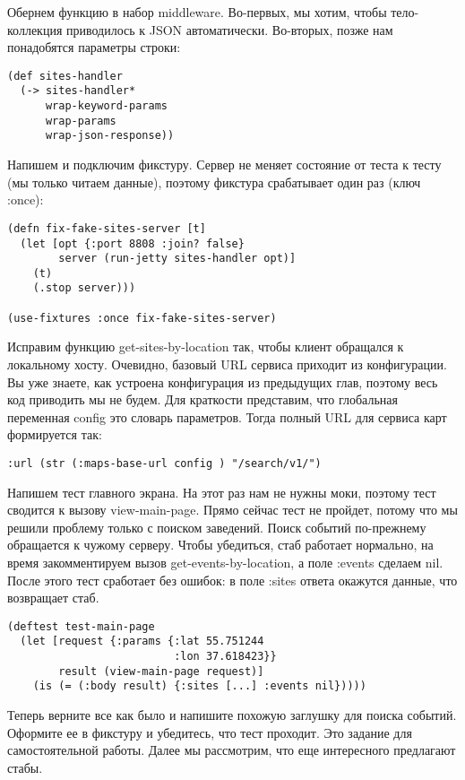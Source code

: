 Обернем функцию в набор middleware. Во-первых, мы хотим, чтобы тело-коллекция
приводилось к JSON автоматически. Во-вторых, позже нам понадобятся параметры
строки:

\begin{verbatim}
(def sites-handler
  (-> sites-handler*
      wrap-keyword-params
      wrap-params
      wrap-json-response))
\end{verbatim}

Напишем и подключим фикстуру. Сервер не меняет состояние от теста к тесту (мы
только читаем данные), поэтому фикстура срабатывает один раз (ключ :once):

\begin{verbatim}
(defn fix-fake-sites-server [t]
  (let [opt {:port 8808 :join? false}
        server (run-jetty sites-handler opt)]
    (t)
    (.stop server)))

(use-fixtures :once fix-fake-sites-server)
\end{verbatim}

Исправим функцию get-sites-by-location так, чтобы клиент обращался к локальному
хосту. Очевидно, базовый URL сервиса приходит из конфигурации. Вы уже знаете,
как устроена конфигурация из предыдущих глав, поэтому весь код приводить мы не
будем. Для краткости представим, что глобальная переменная config это словарь
параметров. Тогда полный URL для сервиса карт формируется так:

\begin{verbatim}
:url (str (:maps-base-url config ) "/search/v1/")
\end{verbatim}

Напишем тест главного экрана. На этот раз нам не нужны моки, поэтому тест
сводится к вызову view-main-page. Прямо сейчас тест не пройдет, потому что мы
решили проблему только с поиском заведений. Поиск событий по-прежнему обращается
к чужому серверу. Чтобы убедиться, стаб работает нормально, на время
закомментируем вызов get-events-by-location, а поле :events сделаем nil. После
этого тест сработает без ошибок: в поле :sites ответа окажутся данные, что
возвращает стаб.

\begin{verbatim}
(deftest test-main-page
  (let [request {:params {:lat 55.751244
                          :lon 37.618423}}
        result (view-main-page request)]
    (is (= (:body result) {:sites [...] :events nil}))))
\end{verbatim}

Теперь верните все как было и напишите похожую заглушку для поиска
событий. Оформите ее в фикстуру и убедитесь, что тест проходит. Это задание для
самостоятельной работы. Далее мы рассмотрим, что еще интересного предлагают
стабы.

